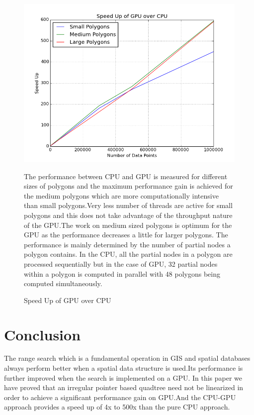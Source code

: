 \documentclass{article}
\begin{document}
\begin{figure}[ht]
\caption{Speed Up of GPU over CPU}
\includegraphics[scale=0.5]{SpeedUp}

The performance between CPU and GPU is measured for different sizes of polygons and the maximum performance gain is achieved for the medium polygons which are more computationally intensive than small polygons.Very less number of threads are active for small polygons  and this does not take advantage of the throughput nature of the GPU.The work on medium sized polygons is optimum for the GPU as the performance decreases a little for larger polygons.
The performance is mainly determined by the number of partial nodes a polygon contains. In the CPU, all the partial nodes in a polygon are processed sequentially but in the case of GPU, 32 partial nodes within a polygon is computed in parallel with 48 polygons being computed simultaneously.

\end{figure}

\clearpage
\section{Conclusion}
The range search which is a fundamental operation in GIS and spatial databases always perform better when a spatial data structure is used.Its performance is further improved when the search is implemented on a GPU.
In this paper we have proved that an irregular pointer based quadtree  need not be linearized in order to achieve a significant performance gain on GPU.And the CPU-GPU approach provides a speed up of 4x to 500x than the pure CPU approach. 
\end{document}
